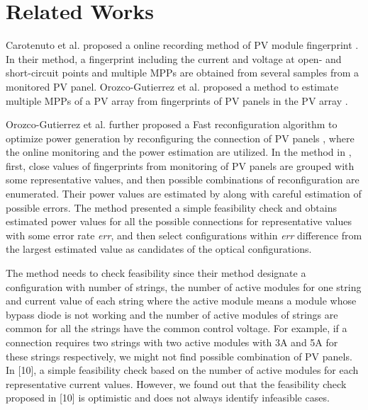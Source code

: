 \documentclass[conference]{IEEEtran}
\begin{document}


\section{Related Works}
Carotenuto et al. proposed a online recording method of PV module fingerprint \cite{b6}. In their method, a fingerprint including the current and voltage at open- and short-circuit points and multiple MPPs are obtained from several samples from a monitored PV panel. Orozco-Gutierrez et al. proposed a method to estimate multiple MPPs of a PV array from fingerprints of PV panels in the PV array \cite{b7}.

Orozco-Gutierrez et al. further proposed a Fast reconfiguration algorithm to optimize power generation by reconfiguring the connection of PV panels \cite{b10}, where the online monitoring \cite{b6} and the power estimation \cite{b7} are utilized. In the method in \cite{b10}, first, close values of fingerprints from monitoring of PV panels are grouped with some representative values, and then possible combinations of reconfiguration are enumerated. Their power values are estimated by \cite{b7} along with careful estimation of possible errors. The method presented a simple feasibility check and obtains estimated power values for all the possible connections for representative values with some error rate \textit{err}, and then select configurations within \textit{err} difference from the largest estimated value as candidates of the optical configurations. 

The method \cite{b10} needs to check feasibility since their method designate a configuration with number of strings, the number of active modules for one string and current value of each string where the active module means a module whose bypass diode is not working and the number of active modules of strings are common for all the strings have the common control voltage. For example, if a connection requires two strings with two active modules with 3A and 5A for these strings respectively, we might not find possible combination of PV panels. In [10], a simple feasibility check based on the number of active modules for each representative current values. However, we found out that the feasibility check proposed in [10] is optimistic and does not always identify infeasible cases. 
\end{document}
